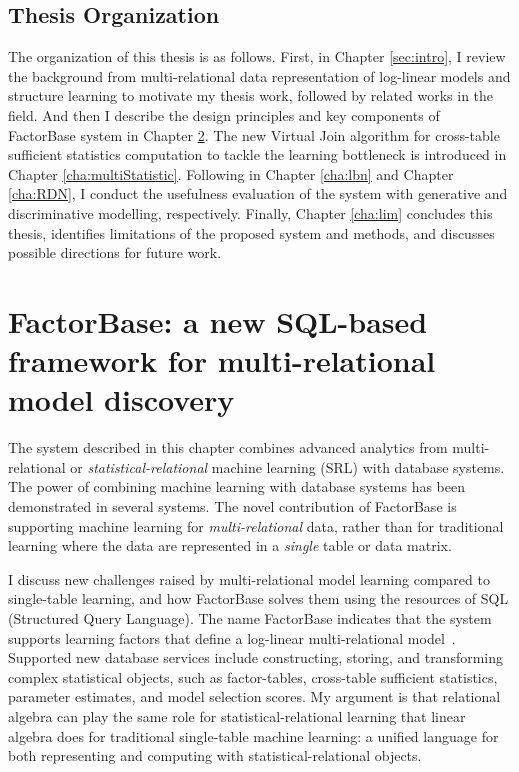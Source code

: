 \documentclass{sfuthesis}
\begin{document}
\section{Thesis Organization}
The organization of this thesis is as follows. 
First, in Chapter \ref{sec:intro}, I review the background from multi-relational data representation of log-linear models and structure learning to motivate my thesis work, followed by related works in the field.  And then I describe  the design principles and key components of FactorBase system in Chapter \ref{cha:system}. The new Virtual Join algorithm for cross-table sufficient statistics computation to tackle the learning bottleneck is introduced in Chapter \ref{cha:multiStatistic}.
Following in Chapter \ref{cha:lbn} and Chapter \ref{cha:RDN}, I conduct the usefulness evaluation of the system with generative and discriminative modelling, respectively.
Finally, Chapter \ref{cha:lim} concludes this thesis, identifies limitations of the proposed system and methods, and discusses possible directions for future work. 

\chapter{FactorBase: a new SQL-based framework for multi-relational model discovery} \label{cha:system}



The system described in this chapter combines advanced analytics from multi-relational or {\em statistical-relational} machine learning (SRL) with database systems. The power of combining machine learning with database systems has been demonstrated in several systems\cite{MADlib_VLDB_2012,MLbase_ICDR_2013,Deshpande2006}.
The novel contribution of FactorBase  is supporting machine learning for {\em multi-relational} data, rather than for traditional learning where the  data are represented in a {\em single} table or data matrix. 

I  discuss new challenges raised by multi-relational model learning compared to single-table learning, and how FactorBase  solves them using the resources of SQL (Structured Query Language). The name FactorBase  indicates that the system supports learning factors that define a log-linear multi-relational model~\cite{Kimmig2015}. Supported new database services include constructing, storing, and transforming complex statistical objects, such as factor-tables, cross-table sufficient statistics, parameter estimates, and model selection scores.
My argument is that relational algebra can play the same role for statistical-relational learning that linear algebra does for traditional single-table machine learning:  a unified language for both representing and computing with statistical-relational objects. 
\end{document}
